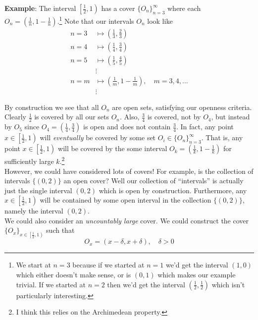 \documentclass[12pt]{article}
\newlength\tindent
\renewcommand{\indent}{\hspace*{\tindent}}
\begin{document}
{\bf Example}: The interval $\left[ \frac{1}{2}, 1\right)$ has a cover $\{O_n\}^\infty_{n=3}$ where each $O_n = \left(\frac{1}{n}, 1 - \frac{1}{n}\right)$.\footnote{We start at $n = 3$ because if we started at $n = 1$ we'd get the interval $(1, 0)$ which either doesn't make sense, or is $(0, 1)$ which makes our example trivial. If we started at $n = 2$ then we'd get the interval $\left(\frac{1}{2},\frac{1}{2}\right)$ which isn't particularly interesting.} Note that our intervals $O_n$ look like
\begin{align*}
	n = 3 &\mapsto \left(\frac{1}{3}, \frac{2}{3}\right) \\
	n = 4 &\mapsto \left(\frac{1}{4}, \frac{3}{4}\right) \\
	n = 5 &\mapsto \left(\frac{1}{5}, \frac{4}{5}\right) \\
	&\vdots \\
	n = m &\mapsto \left(\frac{1}{m}, 1 - \frac{1}{m}\right), \quad m = 3, 4, ... \\
	&\vdots
\end{align*}

\indent By construction we see that all $O_n$ are open sets, satisfying our openness criteria. Clearly $\frac{1}{2}$ is covered by all our sets $O_n$. Also, $\frac{3}{4}$ is covered, not by $O_4$, but instead by $O_5$ since $O_4 = \left(\frac{1}{4}, \frac{3}{4}\right)$ is open and does not contain $\frac{3}{4}$. In fact, any point $x \in\left[\frac{1}{2}, 1\right)$ will {\em eventually} be covered by some set $O_i \in \{O_n\}^\infty_{n = 3}$. That is, any point $x \in \left[\frac{1}{2},1\right)$ will be covered by the some interval $O_{k} = \left(\frac{1}{k}, 1 - \frac{1}{k}\right)$ for sufficiently large $k$.\footnote{I think this relies on the Archimedean property.} \\

\indent However, we could have considered lots of covers! For example, is the collection of intervals $\{(0,2)\}$ an open cover? Well our collection of ``intervals'' is actually just the single interval $(0, 2)$ which is open by construction. Furthermore, any $x \in \left[\frac{1}{2}, 1\right)$ will be contained by some open interval in the collection $\{(0, 2)\}$, namely the interval $(0, 2)$. \\

\indent We could also consider an {\em uncountably large} cover. We could construct the cover $\{O_x\}_{x \in \left[ \frac{1}{2}, 1 \right)}$ such that
\begin{equation*}
	O_x = (x - \delta, x + \delta), \quad \delta > 0
\end{equation*}
\end{document}
